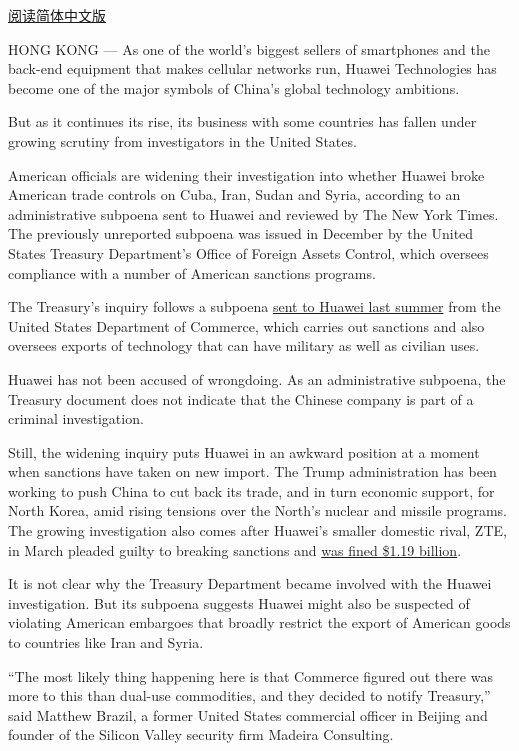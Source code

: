\href{https://cn.nytimes.com/business/20170427/huawei-investigation-sanctions-subpoena/}{阅读简体中文版}

HONG KONG --- As one of the world's biggest sellers of smartphones and
the back-end equipment that makes cellular networks run, Huawei
Technologies has become one of the major symbols of China's global
technology ambitions.

But as it continues its rise, its business with some countries has
fallen under growing scrutiny from investigators in the United States.

American officials are widening their investigation into whether Huawei
broke American trade controls on Cuba, Iran, Sudan and Syria, according
to an administrative subpoena sent to Huawei and reviewed by The New
York Times. The previously unreported subpoena was issued in December by
the United States Treasury Department's Office of Foreign Assets
Control, which oversees compliance with a number of American sanctions
programs.

The Treasury's inquiry follows a subpoena
\href{https://www.nytimes.com/2016/06/03/technology/huawei-technologies-subpoena-iran-north-korea.html}{sent
to Huawei last summer} from the United States Department of Commerce,
which carries out sanctions and also oversees exports of technology that
can have military as well as civilian uses.

Huawei has not been accused of wrongdoing. As an administrative
subpoena, the Treasury document does not indicate that the Chinese
company is part of a criminal investigation.

Still, the widening inquiry puts Huawei in an awkward position at a
moment when sanctions have taken on new import. The Trump administration
has been working to push China to cut back its trade, and in turn
economic support, for North Korea, amid rising tensions over the North's
nuclear and missile programs. The growing investigation also comes after
Huawei's smaller domestic rival, ZTE, in March pleaded guilty to
breaking sanctions and
\href{https://www.nytimes.com/2017/03/07/technology/zte-china-fine.html}{was
fined \$1.19 billion}.

It is not clear why the Treasury Department became involved with the
Huawei investigation. But its subpoena suggests Huawei might also be
suspected of violating American embargoes that broadly restrict the
export of American goods to countries like Iran and Syria.

``The most likely thing happening here is that Commerce figured out
there was more to this than dual-use commodities, and they decided to
notify Treasury,'' said Matthew Brazil, a former United States
commercial officer in Beijing and founder of the Silicon Valley security
firm Madeira Consulting.

